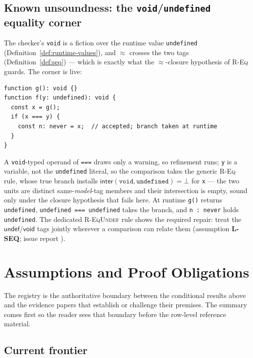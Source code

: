 \documentclass[11pt]{article}
\begin{document}
\subsection{Known unsoundness: the \texttt{void}/\texttt{undefined}
equality corner}
\label{sec:ex-voidseq}
The checker's \texttt{void} is a fiction over the runtime value
\texttt{undefined} (Definition~\ref{def:runtime-values}), and $\approx$
crosses the two tags (Definition~\ref{def:seq}) — which is exactly what
the $\approx$-closure hypothesis of \textsc{R-Eq} guards. The corner is
live:
\begin{verbatim}
function g(): void {}
function f(y: undefined): void {
  const x = g();
  if (x === y) {
    const n: never = x;  // accepted; branch taken at runtime
  }
}
\end{verbatim}
A \texttt{void}-typed operand of \texttt{===} draws only a warning, so
refinement runs; \texttt{y} is a variable, not the \texttt{undefined}
literal, so the comparison takes the generic \textsc{R-Eq} rule, whose
true branch installs
$\mathsf{inter}(\texttt{void}, \texttt{undefined}) = \bot$ for
\texttt{x} — the two units are distinct same-\emph{model}-tag members
and their intersection is empty, sound only under the closure
hypothesis that fails here. At runtime \texttt{g()} returns
\texttt{undefined}, \texttt{undefined === undefined} takes the branch,
and \texttt{n : never} holds \texttt{undefined}. The dedicated
\textsc{R-EqUndef} rule shows the required repair: treat the
$\mathsf{undef}$/$\mathsf{void}$ tags jointly wherever a comparison can
relate them (assumption \textbf{L-SEQ}; issue report
).

\section{Assumptions and Proof Obligations}
\label{sec:assumptions}

The registry is the authoritative boundary between the conditional results
above and the evidence papers that establish or challenge their premises. The
summary comes first so the reader sees that boundary before the row-level
reference material.

\subsection{Current frontier}


\end{document}
